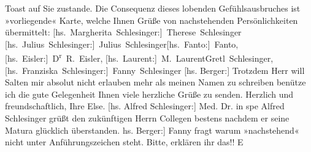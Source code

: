 \begin{ledgroupsized}[t]{13cm}
               Toast auf Sie zustande. Die Consequenz dieses lobenden Gefühlsausbruches ist
               »vorliegende« Karte, welche Ihnen Grüße von nachstehenden Persönlichkeiten
               übermittelt:\pend
           \pstart \spacefill\mbox{{[}hs. Margherita Schlesinger:{]} Therese Schlesinger}{ }\spacefill\mbox{{[}hs. Julius Schlesinger:{]} Julius Schlesinger}\spacefill\mbox{{[}hs. Fanto:{]} Fanto}, \spacefill\mbox{{[}hs. Eisler:{]} D\textsuperscript{r} R. Eisler},
               \spacefill\mbox{{[}hs. Laurent:{]} M. Laurent}\spacefill\mbox{Gretl Schlesinger,}\spacefill\mbox{{[}hs. Franziska Schlesinger:{]} Fanny Schlesinger}\pend{}\pstart
           {[}hs. Berger:{]} Trotzdem Herr \introOben{}will\introOben{} Salten mir absolut nicht erlauben mehr als meinen Namen
               zu schreiben benütze ich die gute Gelegenheit Ihnen viele herzliche Grüße zu
               senden.\pend
           \pstart
           Herzlich und freundschaftlich, Ihre \spacefill\mbox{Else.}\pend
           \pstart
           {[}hs. Alfred Schlesinger:{]} Med. Dr. \introOben{}in spe\introOben{} Alfred Schlesinger grüßt den zukünftigen Herrn Collegen
               bestens nachdem er seine Matura glücklich überstanden.\pend
           \pstart
           \noindent{}{[}hs. Berger:{]} Fanny fragt warum »nachstehend« nicht unter Anführungszeichen steht. Bitte,
                  erklären  ihr das!! \spacefill\mbox{E}\pend
           
         
         \endnumbering{}\end{ledgroupsized}\begin{anhang}\end{anhang}\newcommand{\dateiname}{L03177}\newcommand{\titel}{Felix Salten u. a. an Arthur Schnitzler, 6. 8. 1896}\newcommand{\editorInnen}{Martin Anton Müller und Laura Untner}
      